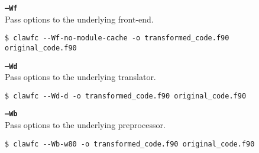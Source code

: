 \documentclass{article}
\begin{document}
\textbf{\texttt{--Wf}}\\
Pass options to the underlying front-end.
\begin{lstlisting}
$ clawfc --Wf-no-module-cache -o transformed_code.f90 original_code.f90
\end{lstlisting}

\textbf{\texttt{--Wd}}\\
Pass options to the underlying translator.
\begin{lstlisting}
$ clawfc --Wd-d -o transformed_code.f90 original_code.f90
\end{lstlisting}

\textbf{\texttt{--Wb}}\\
Pass options to the underlying preprocessor.
\begin{lstlisting}
$ clawfc --Wb-w80 -o transformed_code.f90 original_code.f90
\end{lstlisting}
\end{document}
